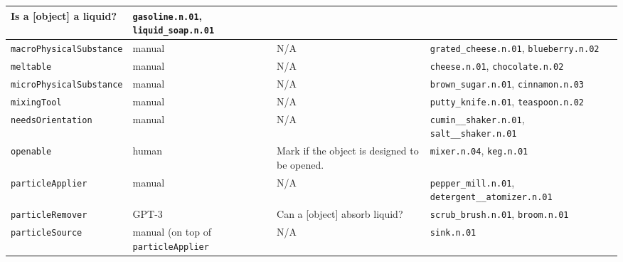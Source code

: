 {\begin{longtable}{|l|p{}|p{}|p{}|}
            Is a [object] a liquid? & 
             \texttt{gasoline.n.01}, \mbox{\texttt{liquid\_soap.n.01}} 
        \\\hline
        \texttt{macroPhysicalSubstance} & 
            manual &
            N/A & 
             \texttt{grated\_cheese.n.01}, \texttt{blueberry.n.02} 
        \\\hline
        \texttt{meltable} & 
            manual &
            N/A & 
             \texttt{cheese.n.01}, \texttt{chocolate.n.02} 
        \\\hline
        \texttt{microPhysicalSubstance} & 
            manual &
            N/A & 
             \texttt{brown\_sugar.n.01}, \texttt{cinnamon.n.03} 
        \\\hline
        \texttt{mixingTool} & 
            manual &
            N/A & 
             \texttt{putty\_knife.n.01}, \texttt{teaspoon.n.02} 
        \\\hline
        \texttt{needsOrientation} & 
            manual &
            N/A & 
             \texttt{cumin\_\_shaker.n.01}, \texttt{salt\_\_shaker.n.01} 
        \\\hline
        \texttt{openable} & 
            human &
            Mark if the object is designed to be opened. &
             \texttt{mixer.n.04}, \texttt{keg.n.01} 
        \\\hline
        \texttt{particleApplier} & 
            manual &
            N/A &
             \texttt{pepper\_mill.n.01}, \texttt{detergent\_\_atomizer.n.01} 
        \\\hline
        \texttt{particleRemover} & 
            GPT-3 &
            Can a [object] absorb liquid? &
             \texttt{scrub\_brush.n.01}, \texttt{broom.n.01} 
        \\\hline
        \texttt{particleSource} & 
            manual (on top of \texttt{particleApplier} &
            N/A &
             \texttt{sink.n.01}
        \\\hline

\end{longtable}}
